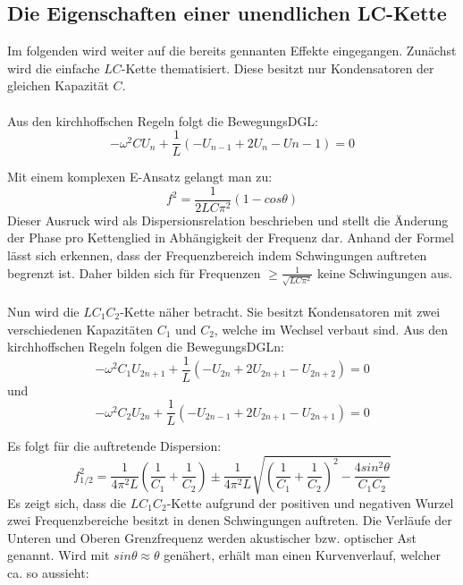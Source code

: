\subsection{Die Eigenschaften einer unendlichen LC-Kette}


Im folgenden wird weiter auf die bereits gennanten Effekte eingegangen. Zunächst
 wird die einfache $LC$-Kette thematisiert. Diese besitzt nur Kondensatoren der
 gleichen Kapazität $C$.\\\\

Aus den kirchhoffschen Regeln folgt die BewegungsDGL:
\begin{equation}
- \omega ^2 C U_n + \frac{1}{L} \left( -U_{n-1} + 2U_ n -U{n-1} \right) = 0
\end{equation}

Mit einem komplexen E-Ansatz gelangt man zu:
\begin{equation}
 f ^2 = \frac{1}{2LC\pi^2}(1-cos\theta)
\end{equation}
Dieser Ausruck wird als Dispersionsrelation beschrieben und stellt die Änderung
 der Phase pro Kettenglied in Abhängigkeit der Frequenz dar. Anhand der Formel lässt sich erkennen,
  dass der Frequenzbereich indem Schwingungen auftreten begrenzt ist. Daher bilden sich
   für Frequenzen $\geq \frac{1}{\sqrt{LC\pi^2}}$ keine Schwingungen aus.\\\\

 Nun wird die $LC_1C_2$-Kette näher betracht. Sie besitzt Kondensatoren mit zwei
  verschiedenen Kapazitäten $C_1$ und $C_2$, welche im Wechsel verbaut sind.
 Aus den kirchhoffschen Regeln folgen die BewegungsDGLn:
 \begin{equation}
   -\omega^2 C_1 U_{2n+1} + \frac{1}{L} \left( -U_{2n} + 2U_{2n+1} - U_{2n+2} \right) = 0
 \end{equation}
 und
 \begin{equation}
   -\omega^2 C_2 U_{2n} + \frac{1}{L} \left( -U_{2n-1} + 2U_{2n+1} - U_{2n+1} \right) = 0
 \end{equation}

Es folgt für die auftretende Dispersion:
\begin{equation}
  f_{1/2}^2 = \frac{1}{4\pi^2L}\left(\frac{1}{C_1}+\frac{1}{C_2}\right) \pm \frac{1}{4\pi^2L}\sqrt{\left(\frac{1}{C_1}+\frac{1}{C_2} \right)^2 - \frac{4 sin^2\theta}{C_1C_2}}
\end{equation}
Es zeigt sich, dass die $LC_1C_2$-Kette aufgrund der positiven und negativen Wurzel
zwei Frequenzbereiche besitzt in denen Schwingungen auftreten. Die Verläufe der Unteren und Oberen
 Grenzfrequenz werden akustischer bzw. optischer Ast genannt. Wird mit
$sin \theta \approx \theta$ genähert, erhält man einen Kurvenverlauf, welcher ca. so aussieht:

